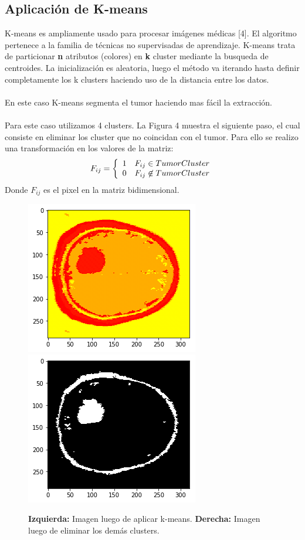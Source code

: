 \documentclass[conference]{IEEEtran}
\begin{document}
\subsection{Aplicación de K-means}
K-means es ampliamente usado para procesar imágenes médicas [4]. El algoritmo pertenece a la familia de técnicas no supervisadas de aprendizaje. K-means trata de particionar \textbf{n} atributos (colores) en \textbf{k} cluster mediante la busqueda de centroides. La inicialización es aleatoria, luego el método va iterando hasta definir completamente los k clusters haciendo uso de la distancia entre los datos.\\\\En este caso K-means segmenta el tumor haciendo mas fácil la extracción.\\\\Para este caso utilizamos 4 clusters. La Figura 4 muestra el siguiente paso, el cual consiste en eliminar los cluster que no coincidan con el tumor. Para ello se realizo una transformación en los valores de la matriz:
$$F_{ij} = \left\{
\begin{array}{c l}
 1 & F_{ij} \in Tumor Cluster\\
 0 & F_{ij} \not\in Tumor Cluster
\end{array}
\right.
$$ 
Donde $F_{ij}$ es el pixel en la matriz bidimensional.
\begin{figure}
\begin{center}
\includegraphics[scale=0.4]{img/tumor_kmeans2.png} 
\includegraphics[scale=0.4]{img/tumor_kmeans.png} 
\end{center}
\caption{\textbf{Izquierda:} Imagen luego de aplicar k-means. \textbf{Derecha:} Imagen luego de eliminar los demás clusters.}
\end{figure}
\end{document}
